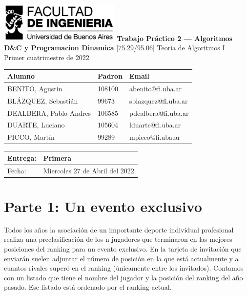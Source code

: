 \documentclass[titlepage,a4paper]{article}
\author{Pablo Andres Dealbera}
\date{\today}
\title{}
\begin{document}
\begin{titlepage}
	\hfill\includegraphics[width=6cm]{assets/logofiuba.jpg}
    \centering
    \vfill
    \Huge \textbf{Trabajo Práctico 2 — Algoritmos D\&C y Programacion Dinamica}
    \vskip2cm
    \Large [75.29/95.06] Teoria de Algoritmos I\\
    Primer cuatrimestre de 2022\\
    \vfill
    \begin{tabular}{ | l | l | l | }
      \hline
      Alumno & Padron & Email \\ \hline
      BENITO, Agustin & 108100 & abenito@fi.uba.ar \\ \hline
      BLÁZQUEZ, Sebastián & 99673 & sblazquez@fi.uba.ar \\ \hline
      DEALBERA, Pablo Andres & 106585 & pdealbera@fi.uba.ar \\ \hline
      DUARTE, Luciano & 105604 & lduarte@fi.uba.ar \\ \hline
      PICCO, Martín & 99289 & mpicco@fi.uba.ar \\ \hline
  	\end{tabular}
    \vfill
    \begin{tabular}{ | l | l | }
      \hline
      Entrega: & Primera \\ \hline
      Fecha: & Miercoles 27 de Abril del 2022 \\ \hline
  	\end{tabular}
    \vfill
    \vfill
\end{titlepage}
\tableofcontents
\newpage
{}

\section{Parte 1: Un evento exclusivo}
\label{sec:org8d65ed6}
Todos los años la asociación de un importante deporte individual profesional realiza una preclasificación de los n jugadores que terminaron en las mejores posiciones del ranking para un evento exclusivo. En la tarjeta de invitación que enviarán suelen adjuntar el número de posición en la que está actualmente y a cuantos rivales superó en el ranking (únicamente entre los invitados). Contamos con un listado que tiene el nombre del jugador y la posición del ranking del año pasado. Ese listado está ordenado por el ranking actual.
\end{document}
